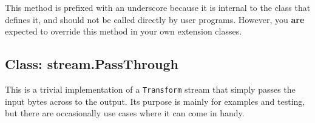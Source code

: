 This method is prefixed with an underscore because it is internal to the
class that defines it, and should not be called directly by user
programs. However, you \textbf{are} expected to override this method in
your own extension classes.

\subsection{Class: stream.PassThrough}

This is a trivial implementation of a \texttt{Transform} stream that
simply passes the input bytes across to the output. Its purpose is
mainly for examples and testing, but there are occasionally use cases
where it can come in handy.
